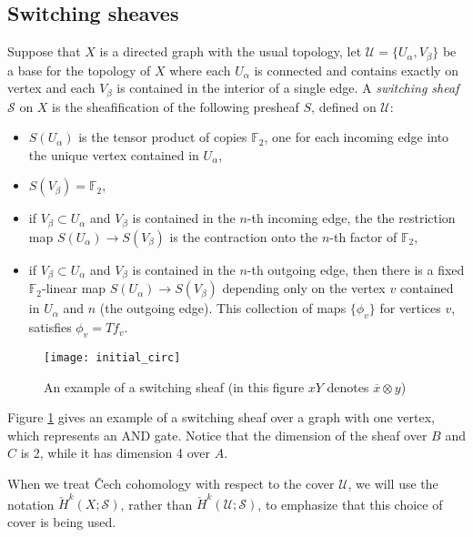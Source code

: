 \documentclass{amsart}
\theoremstyle{plain}
\theoremstyle{definition}
\begin{document}
\subsection{Switching sheaves}
Suppose that $X$ is a directed graph with the usual topology, let $\mathcal{U}=\{U_\alpha,V_\beta\}$ be a base for the topology of $X$ where each $U_\alpha$ is connected and contains exactly on vertex and each $V_\beta$ is contained in the interior of a single edge.
A {\it switching sheaf} $\mathcal{S}$ on $X$ is the sheafification of the following presheaf $S$, defined on $\mathcal{U}$:
\begin{itemize}
\item $S(U_\alpha)$ is the tensor product of copies $\mathbb{F}_2$, one for each incoming edge into the unique vertex contained in $U_\alpha$,
\item $S(V_\beta)=\mathbb{F}_2$,
\item if $V_\beta \subset U_\alpha$ and $V_\beta$ is contained in the
  $n$-th incoming edge, the the restriction map $S(U_\alpha) \to
  S(V_\beta)$ is the contraction onto the $n$-th factor of $\mathbb{F}_2$,
\item if $V_\beta \subset U_\alpha$ and $V_\beta$ is contained in the
  $n$-th outgoing edge, then there is a fixed $\mathbb{F}_2$-linear map
  $S(U_\alpha) \to S(V_\beta)$ depending only on the vertex $v$
  contained in $U_\alpha$ and $n$ (the outgoing edge).  This
  collection of maps $\{\phi_v\}$ for vertices $v$, satisfies $\phi_v=T f_v$.
\end{itemize}

\begin{figure}
\begin{center}
\texttt{[image: initial\_circ]}
\caption{An example of a switching sheaf (in this figure $xY$ denotes $\overline{x}\otimes y$)}
\label{initial_circ_fig}
\end{center}
\end{figure}

Figure \ref{initial_circ_fig} gives an example of a switching sheaf
over a graph with one vertex, which represents an AND gate.  Notice that the dimension of the sheaf over $B$ and $C$ is 2, while it has dimension 4 over $A$.  
 
When we treat \v{C}ech cohomology with respect to the cover $\mathcal{U}$, we will use the notation $\check{H}^k(X;\mathcal{S})$, rather than $\check{H}^k(\mathcal{U};\mathcal{S})$, to emphasize that this choice of cover is being used.
\end{document}
